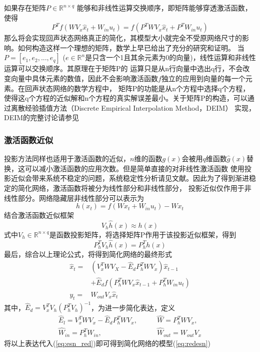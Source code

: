 如果存在矩阵\(P \in \mathbb{R}^{n \times q}\) 能够和非线性运算交换顺序，即矩阵能够穿透激活函数，使得
\begin{equation}
	P^T f(W V_x  \widehat{x}_t + W_{in} u_t) = f(P^T W V_x \widehat{x}_t + P^T W_{in} u_t)	
\end{equation}
那么将会实现回声状态网络真正的简化，其模型大小就完全不受原网络尺寸的影响。如何构造这样一个理想的矩阵，数学上早已给出了充分的研究和证明。
当\(P = [e_1,e_2,...,e_q]\) (\(e \in \mathbb{R}^n\)是只含一个1且其余元素为0的向量)，线性运算和非线性运算可以交换顺序。其原理在于矩阵P的
运算只是从n行向量中选出q行，不会改变向量中具体元素的数值，因此不会影响激活函数\(f\)独立的应用到向量的每一个元素。在回声状态网络的数学方程中，
矩阵P的功能是从n个方程中选择q个方程，使得这q个方程的近似解和n个方程的真实解误差最小。关于矩阵P的构造，可以通过离散经验插值方法（Discrete Empirical Interpolation Method，DEIM）
实现，DEIM的完整讨论请参见

\subsubsection{激活函数近似}
投影方法同样也适用于激活函数的近似，\(n\)维的函数\(g(x)\)会被用\(q\)维函数\(\widehat{g}(x)\)替换，这可以减小激活函数的应用次数。但是简单直接的对非线性激活函数
使用投影近似会带来系统不稳定的问题，系统稳定性分析请见文献。因此为了得到渐进稳定的简化网络，激活函数将被分为线性部分和非线性部分，
投影近似仅作用于非线性部分。网络隐藏层非线性部分可以表示为
\begin{equation}\label{eq:h(x)}
	h(x_t) = f(W x_t + W_{in} u_t) - W x_t
\end{equation}
结合激活函数近似框架
\begin{equation}
	V_h \widehat{h}(x) \approx h(x)
\end{equation}
式中\(V_h \in \mathbb{R}^{n \times q}\)是函数投影矩阵，将选择矩阵P作用于该投影近似框架，得到
\begin{equation}\label{eq:Pselect}
	P_h^T V_h \widehat{h}(x) = P_h^T h(x)
\end{equation}
最后，综合以上理论公式，将得到简化网络的最终形式
\begin{equation}\label{eq:esn_red}
	\begin{split}
		\widehat{x}_t  = &(V_x^T W V_X - \widehat{E}_d P_h^T W V_x)\widehat{x}_{t-1}  \\
					     & + \widehat{E}_{d} f(P_h^T W V_x \widehat{x}_{t-1} + P_h^{T} W_{in} u_{t})	\\
				y_t    = &W_{out} V_x \widehat{x}_t
	\end{split}
\end{equation}
其中，\(\widehat{E}_d = V_x^T V_h (P_h^TV_h)^{-1}\)，为进一步简化表达，定义
\begin{equation}
	\begin{split}
		\widehat{E}_l = V_x^T W V_x - \widehat{E}_d P_h^T W V_x,	\qquad &\widehat{W} = P_h^T W V_x,		\\
		\widehat{W}_{in} = P_h^T W_{in},							\qquad &\widehat{W}_{out} = W_{out}V_x
	\end{split}
\end{equation}
将以上表达代入(\ref{eq:esn_red})即可得到简化网络的模型(\ref{eq:redesn})

